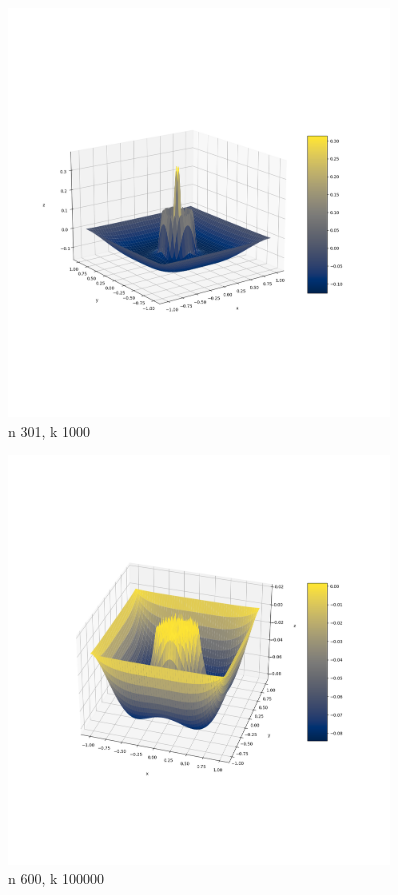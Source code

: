 \documentclass{article}
\begin{document}
    \begin{figure}[h]
        \centering
        \includegraphics[width=0.9\textwidth]{nal1_n301_k1000.png}
        \caption{n 301, k 1000}
    \end{figure}

    \begin{figure}[h]
        \centering
        \includegraphics[width=0.9\textwidth]{nal1_n600_k100000.png}
        \caption{n 600, k 100000}
    \end{figure}
\end{document}
